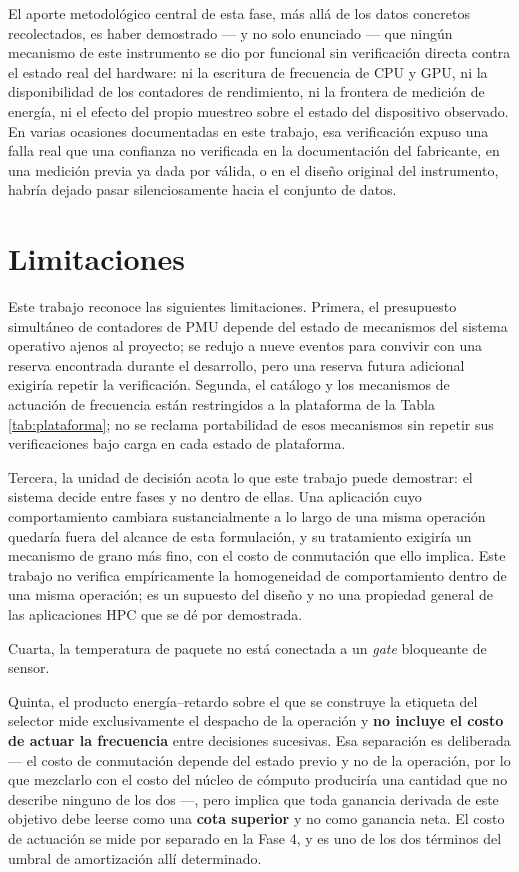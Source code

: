 \documentclass[12pt,oneside,spanish]{book}
\begin{document}
El aporte metodológico central de esta fase, más allá de los datos concretos recolectados, es haber demostrado --- y no solo enunciado --- que ningún mecanismo de este instrumento se dio por funcional sin verificación directa contra el estado real del hardware: ni la escritura de frecuencia de CPU y GPU, ni la disponibilidad de los contadores de rendimiento, ni la frontera de medición de energía, ni el efecto del propio muestreo sobre el estado del dispositivo observado. En varias ocasiones documentadas en este trabajo, esa verificación expuso una falla real que una confianza no verificada en la documentación del fabricante, en una medición previa ya dada por válida, o en el diseño original del instrumento, habría dejado pasar silenciosamente hacia el conjunto de datos.

\section{Limitaciones}

Este trabajo reconoce las siguientes limitaciones. Primera, el presupuesto simultáneo de contadores de PMU depende del estado de mecanismos del sistema operativo ajenos al proyecto; se redujo a nueve eventos para convivir con una reserva encontrada durante el desarrollo, pero una reserva futura adicional exigiría repetir la verificación. Segunda, el catálogo y los mecanismos de actuación de frecuencia están restringidos a la plataforma de la Tabla \ref{tab:plataforma}; no se reclama portabilidad de esos mecanismos sin repetir sus verificaciones bajo carga en cada estado de plataforma.

Tercera, la unidad de decisión acota lo que este trabajo puede demostrar: el sistema decide entre fases y no dentro de ellas. Una aplicación cuyo comportamiento cambiara sustancialmente a lo largo de una misma operación quedaría fuera del alcance de esta formulación, y su tratamiento exigiría un mecanismo de grano más fino, con el costo de conmutación que ello implica. Este trabajo no verifica empíricamente la homogeneidad de comportamiento dentro de una misma operación; es un supuesto del diseño y no una propiedad general de las aplicaciones HPC que se dé por demostrada.

Cuarta, la temperatura de paquete no está conectada a un \textit{gate} bloqueante de sensor.

Quinta, el producto energía--retardo sobre el que se construye la etiqueta del selector mide exclusivamente el despacho de la operación y \textbf{no incluye el costo de actuar la frecuencia} entre decisiones sucesivas. Esa separación es deliberada --- el costo de conmutación depende del estado previo y no de la operación, por lo que mezclarlo con el costo del núcleo de cómputo produciría una cantidad que no describe ninguno de los dos ---, pero implica que toda ganancia derivada de este objetivo debe leerse como una \textbf{cota superior} y no como ganancia neta. El costo de actuación se mide por separado en la Fase 4, y es uno de los dos términos del umbral de amortización allí determinado.
\end{document}
